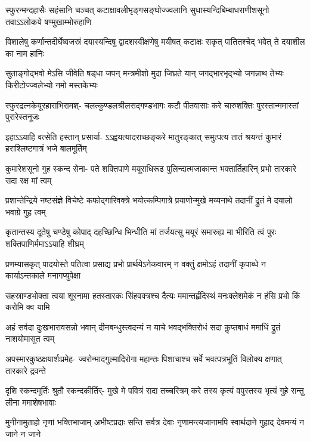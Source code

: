 \fourlineindentedshloka
{स्फुरन्मन्दहासैः सहंसानि चञ्चत्}
{कटाक्षावलीभृङ्गसङ्घोज्ज्वलानि}
{सुधास्यन्दिबिम्बाधराणीशसूनो}
{तवाऽऽलोकये षण्मुखाम्भोरुहाणि}

\fourlineindentedshloka
{विशालेषु कर्णान्तदीर्घेष्वजस्रं}
{दयास्यन्दिषु द्वादशस्वीक्षणेषु}
{मयीषत् कटाक्षः सकृत् पातितश्चेद् }
{भवेत् ते दयाशील का नाम हानिः}

\fourlineindentedshloka
{सुताङ्गोद्भवो मेऽसि जीवेति षड्धा}
{जपन् मन्त्रमीशो मुदा जिघ्रते यान्}
{जगद्भारभृद्भ्यो जगन्नाथ तेभ्यः}
{किरीटोज्ज्वलेभ्यो नमो मस्तकेभ्यः}

\fourlineindentedshloka
{स्फुरद्रत्नकेयूरहाराभिरामश्-}
{चलत्कुण्डलश्रीलसद्गण्डभागः}
{कटौ पीतवासाः करे चारुशक्तिः}
{पुरस्तान्ममास्तां पुरारेस्तनूजः}

\fourlineindentedshloka
{इहाऽऽयाहि वत्सेति हस्तान् प्रसार्या-}
{ऽऽह्वयत्यादराच्छङ्करे मातुरङ्कात्}
{समुत्पत्य तातं श्रयन्तं कुमारं}
{हराश्लिष्टगात्रं भजे बालमूर्तिम्}

\fourlineindentedshloka
{कुमारेशसूनो गुह स्कन्द सेना-}
{पते शक्तिपाणे मयूराधिरूढ}
{पुलिन्दात्मजाकान्त भक्तार्तिहारिन्}
{प्रभो तारकारे सदा रक्ष मां त्वम्}

\fourlineindentedshloka
{प्रशान्तेन्द्रिये नष्टसंज्ञे विचेष्टे}
{कफोद्गारिवक्त्रे भयोत्कम्पिगात्रे}
{प्रयाणोन्मुखे मय्यनाथे तदानीं}
{द्रुतं मे दयालो भवाग्रे गुह त्वम्}

\fourlineindentedshloka
{कृतान्तस्य दूतेषु चण्डेषु कोपाद् }
{दहच्छिन्धि भिन्धीति मां तर्जयत्सु}
{मयूरं समारुह्य मा भीरिति त्वं}
{पुरः शक्तिपाणिर्ममाऽऽयाहि शीघ्रम्}

\fourlineindentedshloka
{प्रणम्यासकृत् पादयोस्ते पतित्वा}
{प्रसाद्य प्रभो प्रार्थयेऽनेकवारम्}
{न वक्तुं क्षमोऽहं तदानीं कृपाब्धे}
{न कार्याऽन्तकाले मनागप्युपेक्षा}

\fourlineindentedshloka
{सहस्राण्डभोक्ता त्वया शूरनामा}
{हतस्तारकः सिंहवक्त्रश्च दैत्यः}
{ममान्तर्हृदिस्थं मनःक्लेशमेकं}
{न हंसि प्रभो किं करोमि क्व यामि}

\fourlineindentedshloka
{अहं सर्वदा दुःखभारावसन्नो}
{भवान् दीनबन्धुस्त्वदन्यं न याचे}
{भवद्भक्तिरोधं सदा कॢप्तबाधं}
{ममाधिं द्रुतं नाशयोमासुत त्वम्}

\fourlineindentedshloka
{अपस्मारकुष्ठक्षयार्शःप्रमेह-}
{ज्वरोन्मादगुल्मादिरोगा महान्तः}
{पिशाचाश्च सर्वे भवत्पत्रभूतिं}
{विलोक्य क्षणात् तारकारे द्रवन्ते}

\fourlineindentedshloka
{दृशि स्कन्दमूर्तिः श्रुतौ स्कन्दकीर्तिर्-}
{मुखे मे पवित्रं सदा तच्चरित्रम्}
{करे तस्य कृत्यं वपुस्तस्य भृत्यं}
{गुहे सन्तु लीना ममाशेषभावाः}

\fourlineindentedshloka
{मुनीनामुताहो नृणां भक्तिभाजाम्}
{अभीष्टप्रदाः सन्ति सर्वत्र देवाः}
{नृणामन्त्यजानामपि स्वार्थदाने}
{गुहाद् देवमन्यं न जाने न जाने}

